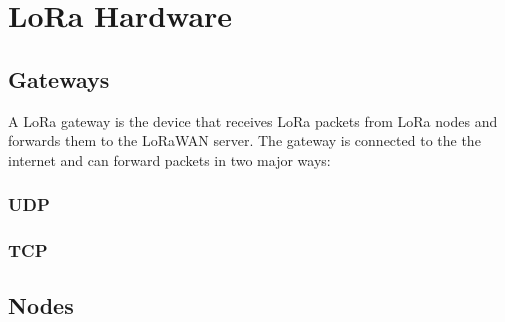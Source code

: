 \section{\ac{LoRa} Hardware}

\subsection{Gateways}

A \ac{LoRa} gateway is the device that receives \ac{LoRa} packets from \ac{LoRa} nodes and forwards them to the \ac{LoRaWAN} server.
The gateway is connected to the the internet and can forward packets in two major ways:

\subsubsection{\ac{UDP}}

\subsubsection{\ac{TCP}}

\subsection{Nodes}